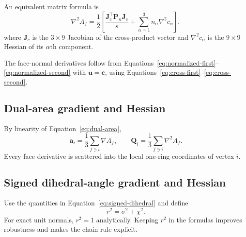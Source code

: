 \documentclass[11pt]{article}
\newcommand{\T}{\mathsf{T}}
\newcommand{\grad}{\nabla}
\newcommand{\Hess}{\nabla^2}
\newcommand{\aV}{\mathbf{a}}
\newcommand{\Q}{\mathbf{Q}}
\newcommand{\Jmat}{\mathbf{J}}
\newcommand{\Pmat}{\mathbf{P}}
\begin{document}
An equivalent matrix formula is
\begin{equation}
  \Hess A_f
  =\frac{1}{2}\left[
    \frac{\Jmat_c^\T\Pmat_n\Jmat_c}{s}
    +\sum_{\alpha=1}^{3}n_\alpha\Hess c_\alpha
  \right],
  \label{eq:area-hessian-matrix}
\end{equation}
where $\Jmat_c$ is the $3\times9$ Jacobian of the cross-product vector and $\Hess c_\alpha$ is the $9\times9$ Hessian of its $\alpha$th component.

The face-normal derivatives follow from Equations~\eqref{eq:normalized-first}--\eqref{eq:normalized-second} with $\mathbf{u}=\mathbf{c}$, using Equations~\eqref{eq:cross-first}--\eqref{eq:cross-second}.

\subsection{Dual-area gradient and Hessian}

By linearity of Equation~\eqref{eq:dual-area},
\begin{equation}
  \boxed{
  \aV_i=\frac{1}{3}\sum_{f\ni i}\grad A_f,
  \qquad
  \Q_i=\frac{1}{3}\sum_{f\ni i}\Hess A_f.}
  \label{eq:dual-area-derivatives}
\end{equation}
Every face derivative is scattered into the local one-ring coordinates of vertex $i$.

\subsection{Signed dihedral-angle gradient and Hessian}

Use the quantities in Equation~\eqref{eq:signed-dihedral} and define
\begin{equation}
  r^2=\sigma^2+\chi^2.
\end{equation}
For exact unit normals, $r^2=1$ analytically.  Keeping $r^2$ in the formulas improves robustness and makes the chain rule explicit.
\end{document}
